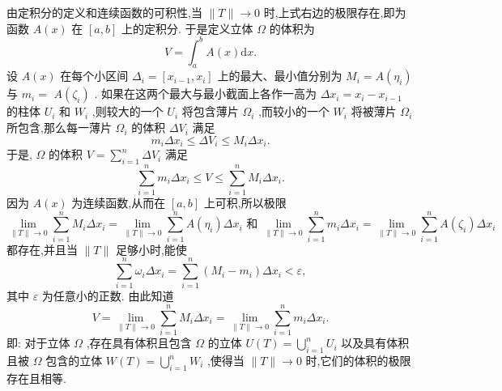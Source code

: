 由定积分的定义和连续函数的可积性,当 \(\parallel T\parallel  \rightarrow  0\) 时,上式右边的极限存在,即为函数 \(A\left( x\right)\) 在 \(\left\lbrack  {a,b}\right\rbrack\) 上的定积分. 于是定义立体 \(\Omega\) 的体积为
\[
V = {\int }_{a}^{b}A\left( x\right) \mathrm{d}x. \tag{1}
\]
设 \(A\left( x\right)\) 在每个小区间 \({\Delta }_{i} = \left\lbrack  {{x}_{i - 1},{x}_{i}}\right\rbrack\) 上的最大、最小值分别为 \({M}_{i} = A\left( {\eta }_{i}\right)\) 与 \({m}_{i} =\)  \(A\left( {\zeta }_{i}\right)\) . 如果在这两个最大与最小截面上各作一高为 \(\Delta {x}_{i} = {x}_{i} - {x}_{i - 1}\) 的柱体 \({U}_{i}\) 和 \({W}_{i}\) ,则较大的一个 \({U}_{i}\) 将包含薄片 \({\Omega }_{i}\) ,而较小的一个 \({W}_{i}\) 将被薄片 \({\Omega }_{i}\) 所包含,那么每一薄片 \({\Omega }_{i}\) 的体积 \(\Delta {V}_{i}\) 满足
\[
{m}_{i}\Delta {x}_{i} \leq  \Delta {V}_{i} \leq  {M}_{i}\Delta {x}_{i}.
\]
于是, \(\Omega\) 的体积 \(V = \mathop{\sum }\limits_{{i = 1}}^{n}\Delta {V}_{i}\) 满足
\[
\mathop{\sum }\limits_{{i = 1}}^{n}{m}_{i}\Delta {x}_{i} \leq  V \leq  \mathop{\sum }\limits_{{i = 1}}^{n}{M}_{i}\Delta {x}_{i}.
\]
因为 \(A\left( x\right)\) 为连续函数,从而在 \(\left\lbrack  {a,b}\right\rbrack\) 上可积,所以极限
\[
\mathop{\lim }\limits_{{\parallel T\parallel  \rightarrow  0}}\mathop{\sum }\limits_{{i = 1}}^{n}{M}_{i}\Delta {x}_{i} = \mathop{\lim }\limits_{{\parallel T\parallel  \rightarrow  0}}\mathop{\sum }\limits_{{i = 1}}^{n}A\left( {\eta }_{i}\right) \Delta {x}_{i}\text{ 和 }\mathop{\lim }\limits_{{\parallel T\parallel  \rightarrow  0}}\mathop{\sum }\limits_{{i = 1}}^{n}{m}_{i}\Delta {x}_{i} = \mathop{\lim }\limits_{{\parallel T\parallel  \rightarrow  0}}\mathop{\sum }\limits_{{i = 1}}^{n}A\left( {\zeta }_{i}\right) \Delta {x}_{i}
\]
都存在,并且当 \(\parallel T\parallel\) 足够小时,能使
\[
\mathop{\sum }\limits_{{i = 1}}^{n}{\omega }_{i}\Delta {x}_{i} = \mathop{\sum }\limits_{{i = 1}}^{n}\left( {{M}_{i} - {m}_{i}}\right) \Delta {x}_{i} < \varepsilon ,
\]
其中 \(\varepsilon\) 为任意小的正数. 由此知道
\[
V = \mathop{\lim }\limits_{{\parallel T\parallel  \rightarrow  0}}\mathop{\sum }\limits_{{i = 1}}^{n}{M}_{i}\Delta {x}_{i} = \mathop{\lim }\limits_{{\parallel T\parallel  \rightarrow  0}}\mathop{\sum }\limits_{{i = 1}}^{n}{m}_{i}\Delta {x}_{i}.
\]
即: 对于立体 \(\Omega\) ,存在具有体积且包含 \(\Omega\) 的立体 \(U\left( T\right)  = \mathop{\bigcup }\limits_{{i = 1}}^{n}{U}_{i}\) 以及具有体积且被 \(\Omega\) 包含的立体 \(W\left( T\right)  = \mathop{\bigcup }\limits_{{i = 1}}^{n}{W}_{i}\) ,使得当 \(\parallel T\parallel  \rightarrow  0\) 时,它们的体积的极限存在且相等.

